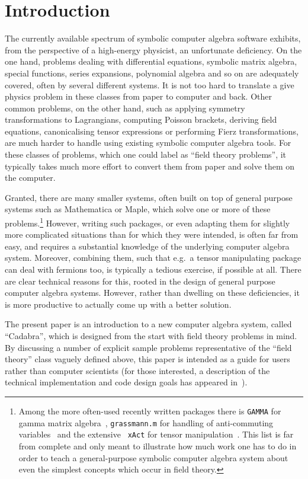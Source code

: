 \documentclass[11pt]{article}
\begin{document}
\section{Introduction}

The currently available spectrum of symbolic computer algebra software
exhibits, from the perspective of a high-energy physicist, an
unfortunate deficiency. On the one hand, problems dealing with
differential equations, symbolic matrix algebra, special functions,
series expansions, polynomial algebra and so on are adequately
covered, often by several different systems. It is not too hard to
translate a give physics problem in these classes from paper to
computer and back. Other common problems, on the other hand, such as
applying symmetry transformations to Lagrangians, computing Poisson
brackets, deriving field equations, canonicalising tensor expressions
or performing Fierz transformations, are much harder to handle using
existing symbolic computer algebra tools. For these classes of problems,
which one could label as ``field theory problems'', it typically takes
much more effort to convert them from paper and solve them on the computer.

Granted, there are many smaller systems, often built on top of general
purpose systems such as Mathematica or Maple, which solve one or more
of these problems.\footnote{Among the more often-used recently written
packages there is {\tt GAMMA} for gamma matrix
algebra~\cite{Gran:2001yh}, {\tt grassmann.m} for handling of
anti-commuting variables~\cite{e_grassmann} and the extensive {\tt
xAct} for tensor manipulation~\cite{e_xact}. This list is far from
complete and only meant to illustrate how much work one has to do in
order to teach a general-purpose symbolic computer algebra system
about even the simplest concepts which occur in field theory.}
However, writing such packages, or even adapting them for slightly
more complicated situations than for which they were intended, is
often far from easy, and requires a substantial knowledge of the
underlying computer algebra system. Moreover, combining them, such
that e.g.~a tensor manipulating package can deal with fermions too, is
typically a tedious exercise, if possible at all. There are clear
technical reasons for this, rooted in the design of general purpose
computer algebra systems. However, rather than dwelling on these
deficiencies, it is more productive to actually come up with a better
solution.

The present paper is an introduction to a new computer algebra system,
called ``Cadabra'', which is designed from the start with field theory
problems in mind. By discussing a number of explicit sample problems
representative of the ``field theory'' class vaguely defined above,
this paper is intended as a guide for users rather than computer
scientists (for those interested, a description of the technical
implementation and code design goals has appeared
in~\cite{Peeters:2006kp}).
\end{document}
